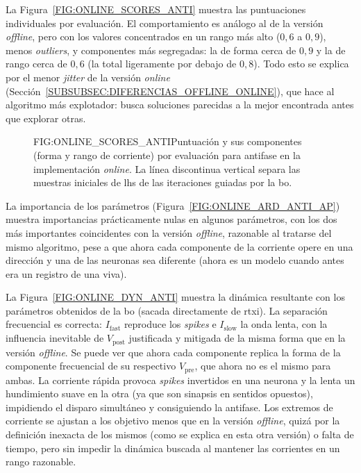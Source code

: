 La Figura~\ref{FIG:ONLINE_SCORES_ANTI} muestra las puntuaciones individuales por evaluación. El comportamiento es análogo al de la versión \textit{offline}, pero con los valores concentrados en un rango más alto ($0{,}6$ a $0{,}9$), menos \textit{outliers}, y componentes más segregadas: la de forma cerca de $0{,}9$ y la de rango cerca de $0{,}6$ (la total ligeramente por debajo de $0{,}8$). Todo esto se explica por el menor \textit{jitter} de la versión \textit{online} (Sección~\ref{SUBSUBSEC:DIFERENCIAS_OFFLINE_ONLINE}), que hace al algoritmo más explotador: busca soluciones parecidas a la mejor encontrada antes que explorar otras.

\begin{figure}[Puntuación y sus componentes por evaluación de la \acl{bo} \textit{online} en antifase]{FIG:ONLINE_SCORES_ANTI}{Puntuación y sus componentes (forma y rango de corriente) por evaluación para antifase en la implementación \textit{online}. La línea discontinua vertical separa las muestras iniciales de \ac{lhs} de las iteraciones guiadas por la \ac{bo}.}
\end{figure}

La importancia de los parámetros (Figura~\ref{FIG:ONLINE_ARD_ANTI_AP}) muestra importancias prácticamente nulas en algunos parámetros, con los dos más importantes coincidentes con la versión \textit{offline}, razonable al tratarse del mismo algoritmo, pese a que ahora cada componente de la corriente opere en una dirección y una de las neuronas sea diferente (ahora es un modelo cuando antes era un registro de una viva).

La Figura~\ref{FIG:ONLINE_DYN_ANTI} muestra la dinámica resultante con los parámetros obtenidos de la \ac{bo} (sacada directamente de \ac{rtxi}). La separación frecuencial es correcta: $I_{\mathrm{fast}}$ reproduce los \textit{spikes} e $I_{\mathrm{slow}}$ la onda lenta, con la influencia inevitable de $V_{\mathrm{post}}$ justificada y mitigada de la misma forma que en la versión \textit{offline}. Se puede ver que ahora cada componente replica la forma de la componente frecuencial de su respectivo $V_{\mathrm{pre}}$, que ahora no es el mismo para ambas. La corriente rápida provoca \textit{spikes} invertidos en una neurona y la lenta un hundimiento suave en la otra (ya que son sinapsis en sentidos opuestos), impidiendo el disparo simultáneo y consiguiendo la antifase. Los extremos de corriente se ajustan a los objetivo menos que en la versión \textit{offline}, quizá por la definición inexacta de los mismos (como se explica en esta otra versión) o falta de tiempo, pero sin impedir la dinámica buscada al mantener las corrientes en un rango razonable.

